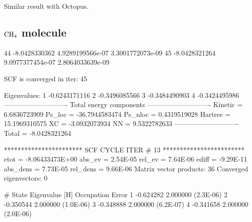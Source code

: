 Similar result with Octopus.


\subsection{$\ce{CH4}$ molecule}

\begin{textcode}
   44      -8.0428330362   4.9289199566e-07   3.3001772073e-09
   45      -8.0428321264   9.0977377454e-07   2.8064033639e-09

SCF is converged in iter: 45

Eigenvalues:
  1      -0.6243171116
  2      -0.3496085566
  3      -0.3484490903
  4      -0.3424495986
----------------------------
Total energy components
----------------------------
Kinetic =       6.6836723909
Ps_loc  =     -36.7944583474
Ps_nloc =       0.4319519028
Hartree =      15.1969310575
XC      =      -3.0932073934
NN      =       9.5322782633
----------------------------
Total   =      -8.0428321264 
\end{textcode}

\begin{textcode}
 *********************** SCF CYCLE ITER #   13 ************************
 etot  = -8.06433473E+00 abs_ev   =  2.54E-05 rel_ev   =  7.64E-06
 ediff =       -9.29E-11 abs_dens =  7.73E-05 rel_dens =  9.66E-06
Matrix vector products:     36
Converged eigenvectors:      0

#  State  Eigenvalue [H]  Occupation    Error
      1       -0.624282    2.000000   (2.3E-06)
      2       -0.350544    2.000000   (1.0E-06)
      3       -0.348888    2.000000   (6.2E-07)
      4       -0.341658    2.000000   (2.0E-06)   
\end{textcode}